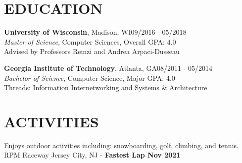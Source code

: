 \documentclass[margin,11pt]{res}
\begin{document}
\begin{resume}
\section{EDUCATION}
\textbf{University of Wisconsin}, Madison, WI\hfill 09/2016 - 05/2018\\
{\sl Master of Science}, Computer Sciences, Overall GPA: 4.0\\
Advised by Professors Remzi and Andrea Arpaci-Dusseau

\vspace{-10pt}
\textbf{Georgia Institute of Technology}, Atlanta, GA\hfill 08/2011 - 05/2014\\
{\sl Bachelor of Science}, Computer Science, Major GPA: 4.0\\
Threads: Information Internetworking and Systems \& Architecture

\section{ACTIVITIES}
Enjoys outdoor activities including: snowboarding, golf, climbing, and tennis.\\
RPM Raceway Jersey City, NJ - \textbf{Fastest Lap Nov 2021}

\end{resume}
\end{document}
